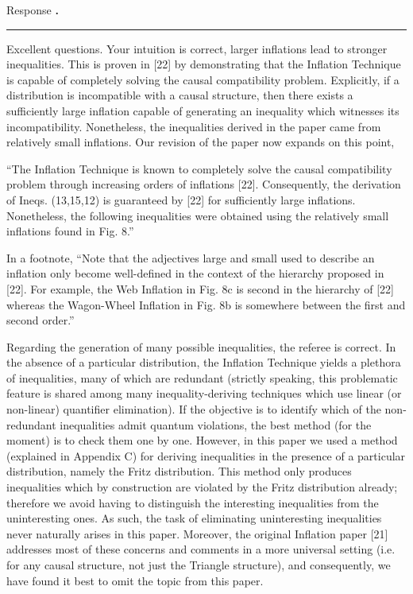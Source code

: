 \documentclass[]{article}
\newcounter{refereecounter}
\newcounter{commentcounter}[refereecounter]
\newcommand{\getresponselabel}{Response \textbf{\arabic{refereecounter}.\arabic{commentcounter}}}
\newcommand{\response}[1]{
    \vspace{1em}
    \getresponselabel \\
    \textcolor{darkgray}{\rule{\linewidth}{0.5pt}}
    #1
}
\begin{document}
    \response{
        Excellent questions. Your intuition is correct, larger inflations lead to stronger inequalities. This is proven in [22] by demonstrating that the Inflation Technique is capable of completely solving the causal compatibility problem. Explicitly, if a distribution is incompatible with a causal structure, then there exists a sufficiently large inflation capable of generating an inequality which witnesses its incompatibility. Nonetheless, the inequalities derived in the paper came from relatively small inflations. Our revision of the paper now expands on this point,

        ``The Inflation Technique is known to completely solve the causal compatibility problem through increasing orders of inflations [22]. Consequently, the derivation of Ineqs. (13,15,12) is guaranteed by [22] for sufficiently large inflations. Nonetheless, the following inequalities were obtained using the relatively small inflations found in Fig. 8.''

        In a footnote,
        ``Note that the adjectives large and small used to describe an inflation only become well-defined in the context of the hierarchy proposed in [22]. For example, the Web Inflation in Fig. 8c is second in the hierarchy of [22] whereas the Wagon-Wheel Inflation in Fig. 8b is somewhere between the first and second order.''

        Regarding the generation of many possible inequalities, the referee is correct. In the absence of a particular distribution, the Inflation Technique yields a plethora of inequalities, many of which are redundant (strictly speaking, this problematic feature is shared among many inequality-deriving techniques which use linear (or non-linear) quantifier elimination). If the objective is to identify which of the non-redundant inequalities admit quantum violations, the best method (for the moment) is to check them one by one. However, in this paper we used a method (explained in Appendix C) for deriving inequalities in the presence of a particular distribution, namely the Fritz distribution. This method only produces inequalities which by construction are violated by the Fritz distribution already; therefore we avoid having to distinguish the interesting inequalities from the uninteresting ones. As such, the task of eliminating uninteresting inequalities never naturally arises in this paper. Moreover, the original Inflation paper [21] addresses most of these concerns and comments in a more universal setting (i.e. for any causal structure, not just the Triangle structure), and consequently, we have found it best to omit the topic from this paper.
    }
\end{document}
